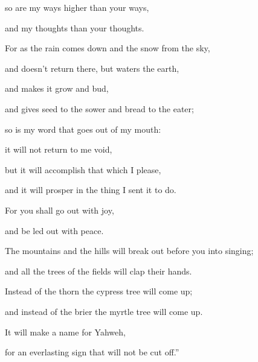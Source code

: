 {\par }{\QB so are my ways higher than your ways,
\par }{\QB and my thoughts than your thoughts.
\par }{\Q {}For as the rain comes down and the snow from the sky,
\par }{\QB and doesn’t return there, but waters the earth,
\par }{\QB and makes it grow and bud,
\par }{\QB and gives seed to the sower and bread to the eater;
\par }{\Q {}so is my word that goes out of my mouth:
\par }{\QB it will not return to me void,
\par }{\QB but it will accomplish that which I please,
\par }{\QB and it will prosper in the thing I sent it to do.
\par }{\Q {}For you shall go out with joy,
\par }{\QB and be led out with peace.
\par }{\Q The mountains and the hills will break out before you into singing;
\par }{\QB and all the trees of the fields will clap their hands.
\par }{\Q {}Instead of the thorn the cypress tree will come up;
\par }{\QB and instead of the brier the myrtle tree will come up.
\par }{\Q It will make a name for Yahweh,
\par }{\QB for an everlasting sign that will not be cut off.”

}
